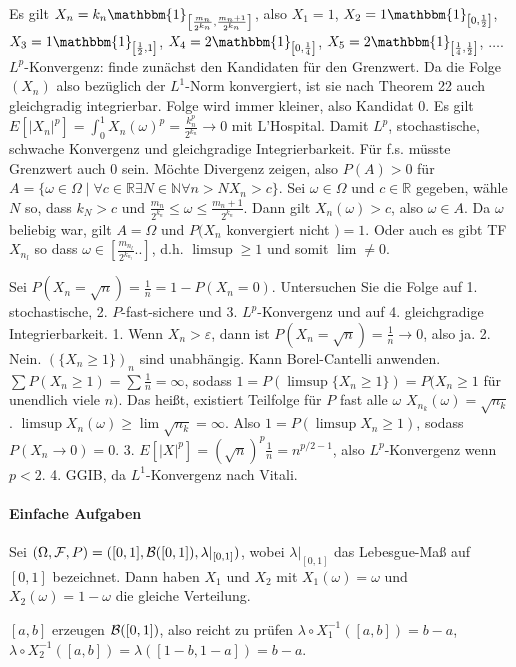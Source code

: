 \documentclass{article}
\begin{document}
Es gilt $X_n=k_n\mathbbm{1}_{\left[\frac{m_n}{2^{k_n}},\frac{m_n+1}{2^{k_n}}\right]}$, also $X_1=1$, $X_2=1\mathbbm{1}_{\left[0,\frac{1}{2}\right]}$, $X_3=1\mathbbm{1}_{\left[\frac{1}{2},1\right]}$, $X_4=2\mathbbm{1}_{\left[0,\frac{1}{4}\right]}$, $X_5=2\mathbbm{1}_{\left[\frac{1}{4},\frac{1}{2}\right]}$, $\dots$.
$L^p$-Konvergenz: finde zunächst den Kandidaten für den Grenzwert.
Da die Folge $(X_n)$ also bezüglich der $L^1$-Norm konvergiert, ist sie nach Theorem 22 auch gleichgradig integrierbar. Folge wird immer kleiner, also Kandidat 0.
Es gilt $E[|X_n|^p]=\int_0^1 X_n(\omega)^p=\frac{k_n^p}{2^{k_n}}\to0$ mit L'Hospital.
Damit $L^p$, stochastische, schwache Konvergenz und gleichgradige Integrierbarkeit.
Für f.s. müsste Grenzwert auch 0 sein.
Möchte Divergenz zeigen, also $P(A)>0$ für $A=\{\omega\in\Omega\mid\forall c\in\mathbb{R}\exists N\in\mathbb{N}\forall n>N X_n>c\}$.
Sei $\omega\in\Omega$ und $c\in\mathbb{R}$ gegeben, wähle $N$ so, dass $k_N>c$ und $\frac{m_n}{2^{k_n}}\leq\omega\leq\frac{m_n+1}{2^{k_n}}$.
Dann gilt $X_n(\omega)>c$, also $\omega\in A$.
Da $\omega$ beliebig war, gilt $A=\Omega$ und $P(X_n$ konvergiert nicht $)=1$.
Oder auch es gibt TF $X_{n_l}$ so dass $\omega\in[\frac{m_{n_l}}{2^{k_{n_l}}}..]$, d.h. $\limsup\geq1$ und somit $\lim\neq0$.

Sei $P(X_n=\sqrt{n})=\frac{1}{n}=1-P(X_n=0)$.
Untersuchen Sie die Folge auf 1. stochastische, 2. $P$-fast-sichere und 3. $L^p$-Konvergenz und auf 4. gleichgradige Integrierbarkeit.
1. Wenn $X_n>\varepsilon$, dann ist $P(X_n=\sqrt{n})=\frac{1}{n}\to0$, also ja.
2. Nein. $(\{X_n\geq1\})_n$ sind unabhängig. Kann Borel-Cantelli anwenden. $\sum P(X_n\geq 1)=\sum\frac{1}{n}=\infty$, sodass $1=P(\limsup\{X_n\geq1\})=P(X_n\geq1$ für unendlich viele $n)$.
Das heißt, existiert Teilfolge für $P$ fast alle $\omega$ $X_{n_k}(\omega)=\sqrt{n_k}$.
$\limsup X_n(\omega)\geq\lim\sqrt{n_k}=\infty$.
Also $1=P(\limsup X_n\geq1)$, sodass $P(X_n\to0)=0$.
3. $E[|X|^p]=(\sqrt{n})^p\frac{1}{n}=n^{p/2-1}$, also $L^p$-Konvergenz wenn $p<2$.
4. GGIB, da $L^1$-Konvergenz nach Vitali.

\paragraph{Einfache Aufgaben}
Sei $(\Omega,{\cal F},P)=([0,1],{\cal B}([0,1]),\lambda|_{[0,1]})$, wobei $\lambda|_{[0,1]}$ das Lebesgue-Maß auf $[0,1]$ bezeichnet.
Dann haben $X_1$ und $X_2$ mit $X_1(\omega)=\omega$ und $X_2(\omega)=1-\omega$ die gleiche Verteilung.

$[a,b]$ erzeugen ${\cal B}([0,1])$, also reicht zu prüfen $\lambda\circ X_1^{-1}([a,b])=b-a$, $\lambda\circ X_2^{-1}([a,b])=\lambda([1-b,1-a])=b-a$.
\end{document}
